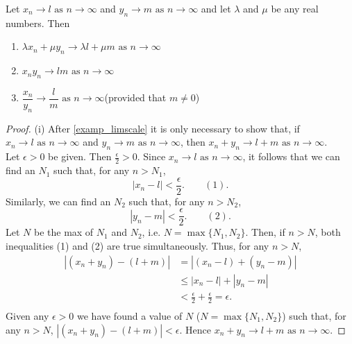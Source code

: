 \documentclass[10pt, a4paper]{article}
\newcommand{\limas}[3][n]{#2 \rightarrow #3 \text{ as } #1 \rightarrow \infty}
\begin{document}
\begin{proposition}\label{prop_limcomb}
    Let $\limas{x_n}{l}$ and $\limas{y_n}{m}$ and let $\lambda$ and $\mu$ be any real numbers. Then
    \begin{enumerate}[label = (\roman*)]
        \item $\limas{\lambda x_n + \mu y_n}{\lambda l + \mu m}$
        \item $\limas{x_n y_n}{lm}$
        \item $\limas{\dfrac{x_n}{y_n}}{\dfrac{l}{m}}$\qquad(provided that $m \neq 0$)
    \end{enumerate}
    \begin{proof}
    (i) After \autoref{examp_limscale} it is only necessary to show that, if $\limas{x_n}{l}$ and $\limas{y_n}{m}$, then $\limas{x_n + y_n}{l + m}$. \\
    Let $\epsilon > 0$ be given. Then $\frac{\epsilon}{2} > 0$. Since $\limas{x_n}{l}$, it follows that we can find an $N_1$ such that, for any $n > N_1$,
    $$|x_n - l| < \frac{\epsilon}{2}.\qquad(1).$$
    Similarly, we can find an $N_2$ such that, for any $n > N_2$,
    $$|y_n - m| < \frac{\epsilon}{2}.\qquad(2).$$
    Let $N$ be the max of $N_1$ and $N_2$, i.e. $N = \max{\{N_1, N_2\}}$. Then, if $n > N$, both inequalities (1) and (2) are true simultaneously. Thus, for any $n > N$,
    \begin{align*}
        |(x_n + y_n) - (l + m)| &= |(x_n - l) + (y_n - m)| \\
        &\leq |x_n - l| + |y_n - m| \\
        &< \frac{\epsilon}{2} + \frac{\epsilon}{2} = \epsilon. \\        
    \end{align*}
    Given any $\epsilon > 0$ we have found a value of $N$ ($N = \max{\{N_1, N_2\}}$) such that, for any $n > N$, $|(x_n + y_n) - (l + m)| < \epsilon$. Hence $\limas{x_n + y_n}{l + m}$.
    \end{proof}
\end{proposition}
\end{document}
